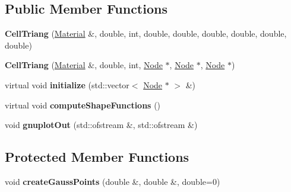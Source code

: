 \subsection*{Public Member Functions}
\begin{CompactItemize}
\item 
\hypertarget{classmknix_1_1CellTriang_642114215cc1b204e7d47eaf4acdac33}{
\textbf{CellTriang} (\hyperlink{classmknix_1_1Material}{Material} \&, double, int, double, double, double, double, double, double)}
\label{classmknix_1_1CellTriang_642114215cc1b204e7d47eaf4acdac33}

\item 
\hypertarget{classmknix_1_1CellTriang_09b96d01eca58fb69f7f1981ed136723}{
\textbf{CellTriang} (\hyperlink{classmknix_1_1Material}{Material} \&, double, int, \hyperlink{classmknix_1_1Node}{Node} $\ast$, \hyperlink{classmknix_1_1Node}{Node} $\ast$, \hyperlink{classmknix_1_1Node}{Node} $\ast$)}
\label{classmknix_1_1CellTriang_09b96d01eca58fb69f7f1981ed136723}

\item 
\hypertarget{classmknix_1_1CellTriang_722c140e2f0e5b57f57212328dbd9761}{
virtual void \textbf{initialize} (std::vector$<$ \hyperlink{classmknix_1_1Node}{Node} $\ast$ $>$ \&)}
\label{classmknix_1_1CellTriang_722c140e2f0e5b57f57212328dbd9761}

\item 
\hypertarget{classmknix_1_1CellTriang_8a0238310df095b94643ac7003442d4e}{
virtual void \textbf{computeShapeFunctions} ()}
\label{classmknix_1_1CellTriang_8a0238310df095b94643ac7003442d4e}

\item 
\hypertarget{classmknix_1_1CellTriang_374f66822e2e37d94a2cfe09c5173e8a}{
void \textbf{gnuplotOut} (std::ofstream \&, std::ofstream \&)}
\label{classmknix_1_1CellTriang_374f66822e2e37d94a2cfe09c5173e8a}

\end{CompactItemize}
\subsection*{Protected Member Functions}
\begin{CompactItemize}
\item 
\hypertarget{classmknix_1_1CellTriang_ed10e1a88d83ece304fa0b88bc7ab2b3}{
void \textbf{createGaussPoints} (double \&, double \&, double=0)}
\label{classmknix_1_1CellTriang_ed10e1a88d83ece304fa0b88bc7ab2b3}

\end{CompactItemize}
